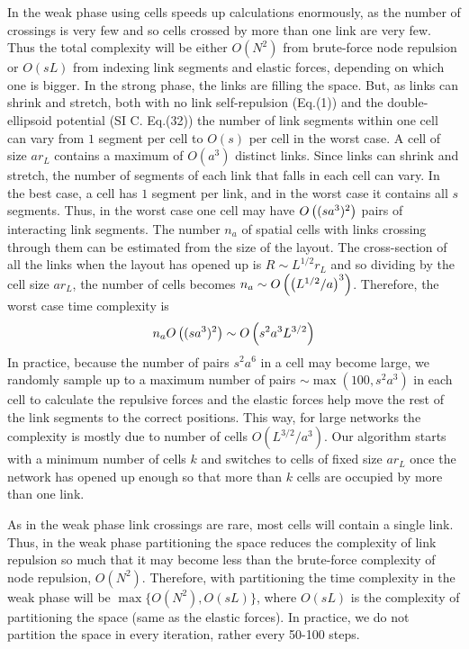 \documentclass[linenumbers,endfloats,nofootinbib,preprint,floatfix,titlepage,superscriptaddress]{revtex4-1} %
\begin{document}
In the weak phase using cells speeds up calculations enormously, as the number of crossings is very few and so cells crossed by more than one link are very few. 
Thus the total complexity will be either $O(N^2)$ from brute-force node repulsion or $O(sL)$ from indexing link segments and elastic forces, depending on which one is bigger.
In the strong phase, the links are filling the space.
But, as links can shrink and stretch, both with no link self-repulsion (Eq.(1)) and the double-ellipsoid potential (SI C. Eq.(32)) the number of link segments within one cell can vary from $1$ segment per cell to $O(s)$ per cell in the worst case.
A cell of size $ar_L$ contains a maximum of $O(a^3)$ distinct links. 
Since links can shrink and stretch, the number of segments of each link that falls in each cell can vary. 
In the best case, a cell has $1$ segment per link, and in the worst case it contains all $s$ segments.
Thus, in the worst case one cell may have $O\left((sa^3)^2\right)$ pairs of interacting link segments. 
The number $n_a$ of spatial cells with links crossing through them can be estimated from the size of the layout. 
The cross-section of all the links when the layout has opened up is $R\sim L^{1/2} r_L$ and so dividing by the cell size $ar_L$, the number of cells becomes $n_a \sim O\left(\left(L^{1/2}/a\right)^3\right)$. 
Therefore, the worst case time complexity is 
\[n_a O\left((sa^3)^2\right) \sim  O\left({ s^2 a^3  L^{3/2} } \right) \]
In practice, because the number of pairs $s^2 a^6$ in a cell may become large, we randomly sample up to a maximum number of pairs $\sim \max (100, s^2 a^3)$ in each cell to calculate the repulsive forces and the elastic forces help move the rest of the link segments to the correct positions. 
This way, for large networks the complexity is mostly due to number of cells $O(L^{3/2}/a^3)$.
Our algorithm starts with a minimum number of cells $k$ and switches to cells of fixed size $ar_L$ once the network has opened up enough so that more than $k$ cells are occupied by more than one link. 

As in the weak phase link crossings are rare, most cells will contain a single link.
Thus, in the weak phase partitioning the space reduces the complexity of link repulsion so much that it may become less than the brute-force complexity of node repulsion, $O(N^2)$.
Therefore,  with partitioning the time complexity in the weak phase will be $\max\{O(N^2),O(sL)\}$, where $O(sL)$ is the complexity of partitioning the space (same as the elastic forces).
In practice, we do not partition the space in every iteration, rather every 50-100 steps. 
\end{document}
